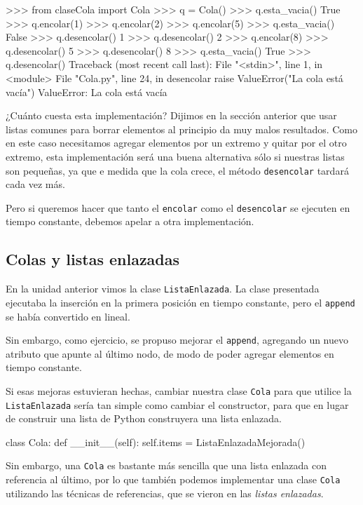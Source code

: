 \begin{codigo-python-sn}
>>> from claseCola import Cola
>>> q = Cola()
>>> q.esta_vacia()
True
>>> q.encolar(1)
>>> q.encolar(2)
>>> q.encolar(5)
>>> q.esta_vacia()
False
>>> q.desencolar()
1
>>> q.desencolar()
2
>>> q.encolar(8)
>>> q.desencolar()
5
>>> q.desencolar()
8
>>> q.esta_vacia()
True
>>> q.desencolar()
Traceback (most recent call last):
  File "<stdin>", line 1, in <module>
  File "Cola.py", line 24, in desencolar
    raise ValueError("La cola está vacía")
ValueError: La cola está vacía
\end{codigo-python-sn}

¿Cuánto cuesta esta implementación?  Dijimos en la sección anterior que
usar listas comunes para borrar elementos al principio da muy malos
resultados. Como en este caso necesitamos agregar elementos por un extremo
y quitar por el otro extremo, esta implementación será una buena
alternativa sólo si nuestras listas son pequeñas, ya que e medida que la
cola crece, el método \lstinline!desencolar! tardará cada vez más.

Pero si queremos hacer que tanto el \lstinline!encolar! como el
\lstinline!desencolar!  se ejecuten en tiempo constante, debemos apelar a
otra implementación.

\subsection{Colas y listas enlazadas}

En la unidad anterior vimos la clase \lstinline!ListaEnlazada!.
La clase presentada ejecutaba la inserción en la primera posición en
tiempo constante, pero el \lstinline|append| se había convertido en lineal.

Sin embargo, como ejercicio, se propuso mejorar el \lstinline|append|,
agregando un nuevo atributo que apunte al último nodo, de modo de poder
agregar elementos en tiempo constante.

Si esas mejoras estuvieran hechas, cambiar nuestra clase \lstinline!Cola!
para que utilice la \lstinline!ListaEnlazada! sería tan simple como cambiar
el constructor, para que en lugar de construir una lista de Python
construyera una lista enlazada.

\begin{codigo-python-sn}
class Cola:
    def __init__(self):
        self.items = ListaEnlazadaMejorada()
\end{codigo-python-sn}

Sin embargo, una \lstinline!Cola! es bastante más sencilla que una
lista enlazada con referencia al último, por lo que también podemos
implementar una clase \lstinline!Cola! utilizando las técnicas de referencias,
que se vieron en las {\it listas enlazadas}.


